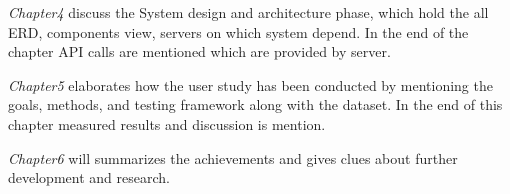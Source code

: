 \textit{Chapter4} discuss the System design and architecture phase, which hold the all ERD, components view, servers on which system depend. In the end of the chapter API calls are mentioned which are provided by server.\newline

\textit{Chapter5} elaborates how the user study has been conducted by mentioning the goals, methods, and testing framework along with the dataset. In the end of this chapter measured results and discussion is mention.\newline
  
\textit{Chapter6} will summarizes the achievements and gives clues about further development and research.\newline
